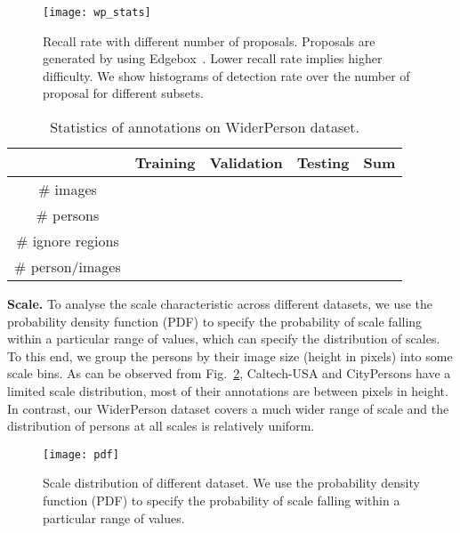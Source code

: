 \documentclass[journal]{IEEEtran}
\begin{document}
\begin{figure}
\begin{centering}
\texttt{[image: wp\_stats]}
\par\end{centering}
\caption{Recall rate with different number of proposals. Proposals are generated by using Edgebox~\cite{DBLP:conf/eccv/ZitnickD14}. Lower recall rate implies higher difficulty. We show histograms of detection rate over the number of proposal for different subsets.}
\label{fig:wp_stats}
\end{figure}

\begin{table}[t]
\caption{Statistics of annotations on WiderPerson dataset.}
\label{tab:Statistics-bb}
\begin{centering}
\setlength{\tabcolsep}{7.5pt}
\begin{tabular}{c|ccc|c}
\toprule[2pt]
 & Training & Validation & Testing & Sum \\
\midrule
{\# images} &  &  &  &  \\
\# persons &  &  &  &  \\
\# ignore regions &  &  &  &  \\
\# person/images &  &  &  &  \\
\bottomrule[2pt]
\end{tabular}
\par\end{centering}
\end{table}

{\flushleft \textbf{Scale. }}
To analyse the scale characteristic across different datasets, we use the probability density function (PDF) to specify the probability of scale falling within a particular range of values, which can specify the distribution of scales. To this end, we group the persons by their image size (height in pixels) into some scale bins. As can be observed from Fig.~\ref{fig:scale}, Caltech-USA and CityPersons have a limited scale distribution, most of their annotations are between  pixels in height. In contrast, our WiderPerson dataset covers a much wider range of scale and the distribution of persons at all scales is relatively uniform.

\begin{figure}[t]
\centering
\label{fig:scale}
\texttt{[image: pdf]}
\caption{Scale distribution of different dataset. We use the probability density function (PDF) to specify the probability of scale falling within a particular range of values.}
\label{fig:scale}
\end{figure}
\end{document}
